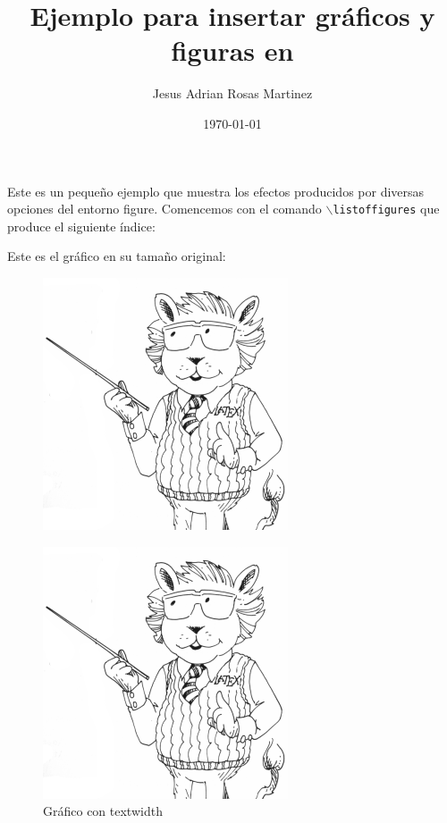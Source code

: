 \documentclass[12pt]{article}
\title{Ejemplo para insertar gráficos y figuras en \LaTeXe}
\author{Jesus Adrian Rosas Martinez}
\date{\small{\today}}
\begin{document}
\maketitle %

Este es un pequeño ejemplo que muestra los efectos producidos por diversas opciones del entorno figure. Comencemos con el comando $\backslash$\texttt{listoffigures} que produce el siguiente índice:

\listoffigures

Este es el gráfico en su tamaño original:
\begin{figure}
\centering
\includegraphics[keepaspectratio]{LaTeXlion2.png}
\end{figure}

\begin{figure}
\centering
\includegraphics[width=\textwidth]{LaTeXlion2.png}
\caption{Gráfico con textwidth}
\label{fig:1}
\end{figure}
\end{document}
